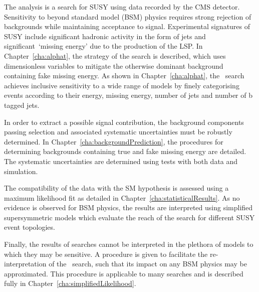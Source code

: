 The \alphat analysis is a search for SUSY using data recorded by the CMS detector. 
Sensitivity to beyond standard model (BSM) physics requires strong rejection of backgrounds while
maintaining acceptance to signal. Experimental signatures of SUSY include significant
hadronic activity in the form of jets and significant~`missing energy' due to the production
of the LSP. In Chapter~\ref{cha:alphat}, the strategy of the \alphat search is described, which uses
dimensionless variables to mitigate the otherwise dominant background containing fake missing energy.
As shown in Chapter~\ref{cha:alphat}, the \alphat~search achieves inclusive sensitivity 
to a wide range of models by finely categorising events according to 
their energy, missing energy, number of jets and number of b tagged jets.

In order to extract a possible signal contribution, the background components passing selection 
and associated systematic uncertainties must be robustly determined. In Chapter~\ref{cha:backgroundPrediction},
the procedures for determining backgrounds containing true and fake missing
energy are detailed. The systematic uncertainties are determined using tests with 
both data and simulation. 

The compatibility of the data with the SM hypothesis is assessed using a maximum likelihood fit 
as detailed in Chapter~\ref{cha:statisticalResults}. As no evidence is observed for BSM physics,
the results are interpreted using simplified supersymmetric models which evaluate the reach
of the search for different SUSY event topologies. 

Finally, the results of searches cannot be interpreted in the plethora of models to which 
they may be sensitive. A procedure is given to facilitate the re-interpretation
of the \alphat~search, such that its impact on any BSM physics may be approximated.
This procedure is applicable to many searches and is described fully in 
Chapter~\ref{cha:simplifiedLikelihood}.

